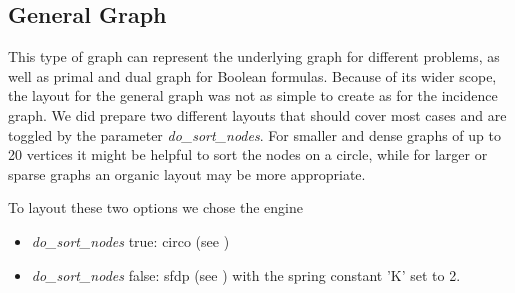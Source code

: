 \documentclass[a4paper, 12pt, bibliography=totoc]{scrartcl}
\begin{document}



\subsection{General Graph}
This type of graph can represent the underlying graph for different problems, as well as primal and dual graph for Boolean formulas.
Because of its wider scope, the layout for the general graph was not as simple to create as for the incidence graph.
We did prepare two different layouts that should cover most cases and are toggled by the parameter \textit{do\_sort\_nodes}.
For smaller and dense graphs of up to 20 vertices it might be helpful to sort the nodes on a circle, while for larger or sparse graphs an organic layout may be more appropriate.

To layout these two options we chose the engine 
\begin{itemize}
	\item \textit{do\_sort\_nodes} true: circo (see \cite{ST99})
	\item \textit{do\_sort\_nodes} false: sfdp (see \cite{Hu05}) with the spring constant 'K' set to 2.
\end{itemize}
\end{document}
